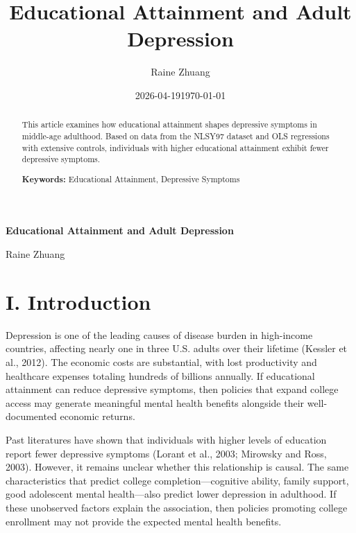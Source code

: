 \documentclass[
  12pt,
]{article}
\title{Educational Attainment and Adult Depression}
\author{Raine Zhuang}
\date{2026-04-19}
\begin{document}
\maketitle

\vspace{0.5in}

\begin{center}
\large
\textbf{Educational Attainment and Adult Depression}
\end{center}

\vspace{0.25in}

\begin{center}
Raine Zhuang
\end{center}

\vspace{0.25in}

\begin{center}
\date{\today}
\end{center}

\vspace{0.5in}

\begin{abstract}
\noindent This article examines how educational attainment shapes depressive symptoms in middle-age adulthood. Based on data from the NLSY97 dataset and OLS regressions with extensive controls, individuals with higher educational attainment exhibit fewer depressive symptoms.

\vspace{0.25in}
\noindent \textbf{Keywords:} Educational Attainment, Depressive Symptoms
\end{abstract}

\newpage

\section{I. Introduction}\label{i.-introduction}

Depression is one of the leading causes of disease burden in high-income
countries, affecting nearly one in three U.S. adults over their lifetime
(Kessler et al., 2012). The economic costs are substantial, with lost
productivity and healthcare expenses totaling hundreds of billions
annually. If educational attainment can reduce depressive symptoms, then
policies that expand college access may generate meaningful mental
health benefits alongside their well-documented economic returns.

Past literatures have shown that individuals with higher levels of
education report fewer depressive symptoms (Lorant et al., 2003;
Mirowsky and Ross, 2003). However, it remains unclear whether this
relationship is causal. The same characteristics that predict college
completion---cognitive ability, family support, good adolescent mental
health---also predict lower depression in adulthood. If these unobserved
factors explain the association, then policies promoting college
enrollment may not provide the expected mental health benefits.
\end{document}

